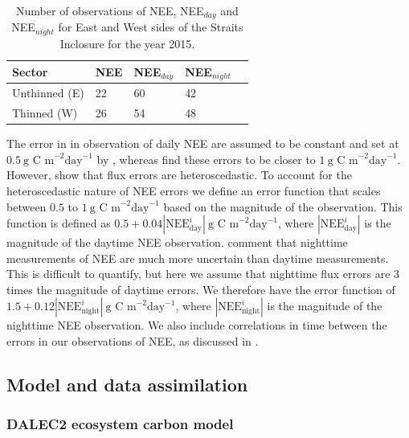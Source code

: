 \documentclass[draft,linenumbers]{agujournal}
\begin{document}
\begin{table}[ht] 
	\caption{Number of observations of NEE, NEE\(_{day}\) and NEE\(_{night}\) for East and West sides of the Straits Inclosure for the year 2015.}
\begin{center}
	\begin{tabular}{| l | l | l | l | l |}
	\hline
	Sector & NEE & NEE\(_{day}\) & NEE\(_{night}\)  \\ \hline
	Unthinned (E) & 22 & 60 & 42 \\ \hline
	Thinned (W) & 26 & 54 & 48 \\ \hline
	\end{tabular}
	\label{table:nee_obs}
\end{center} 
\end{table}

The error in in observation of daily NEE are assumed to be constant and set at $0.5~\text{g C m}^{-2} \text{day}^{-1}$ by \citet{williams2005improved}, whereas \citet{braswell2005estimating} find these errors to be closer to $1~\text{g C m}^{-2} \text{day}^{-1}$. However, \citet{Richardson200838} show that flux errors are heteroscedastic. To account for the heteroscedastic nature of NEE errors we define an error function that scales between $0.5$ to $1~\text{g C m}^{-2} \text{day}^{-1}$ based on the magnitude of the observation. This function is defined as $0.5 + 0.04|\text{NEE}_{\text{day}}^{i}|~\text{g C m}^{-2} \text{day}^{-1}$, where \(|\text{NEE}_{\text{day}}^{i}|\) is the magnitude of the daytime NEE observation. \citet{raupach2005model} comment that nighttime measurements of NEE are much more uncertain than daytime measurements. This is difficult to quantify, but here we assume that nighttime flux errors are 3 times the magnitude of daytime errors. We therefore have the error function of $1.5 + 0.12|\text{NEE}_{\text{night}}^{i}|~\text{g C m}^{-2} \text{day}^{-1}$, where \(|\text{NEE}_{\text{night}}^{i}|\) is the magnitude of the nighttime NEE observation. We also include correlations in time between the errors in our observations of NEE, as discussed in \citet{Pinnington2016299}.

\subsection{Model and data assimilation}
\subsubsection{DALEC2 ecosystem carbon model} \label{sec:dalec2}
\end{document}
